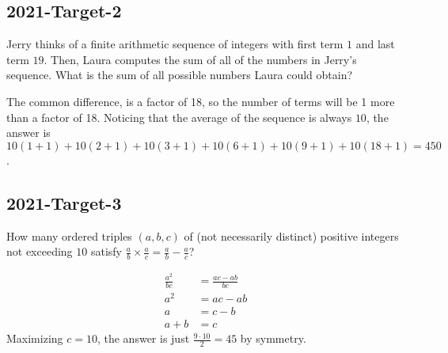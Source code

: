 \documentclass[12pt]{article}
\begin{document}
\subsection*{2021-Target-2}
Jerry thinks of a finite arithmetic sequence of integers with first term $1$ and last term $19$. Then, Laura computes the sum of all of the numbers in Jerry’s sequence. What is the sum of all possible numbers Laura could obtain?
\begin{answer}
The common difference, is a factor of 18, so the number of terms will be 1 more than a factor of 18. Noticing that the average of the sequence is always $10$, the answer is $10(1+1)+10(2+1)+10(3+1)+10(6+1)+10(9+1)+10(18+1)=\boxed{450}$.
\end{answer}

\subsection*{2021-Target-3}
How many ordered triples $(a, b, c)$ of (not necessarily distinct) positive integers not exceeding $10$ satisfy $\frac{a}{b}\times\frac{a}{c} = \frac{a}{b} - \frac{a}{c}$?
\begin{answer}
\begin{align*}
\frac{a^2}{bc} 
  & = \frac{ac-ab}{bc} \\
a^2 & = ac-ab \\
a & = c - b \\
a + b & = c
\end{align*}
Maximizing $c=10$, the answer is just $\frac{9 \cdot 10}{2} = \boxed{45}$ by symmetry.
\end{answer}

\end{document}
